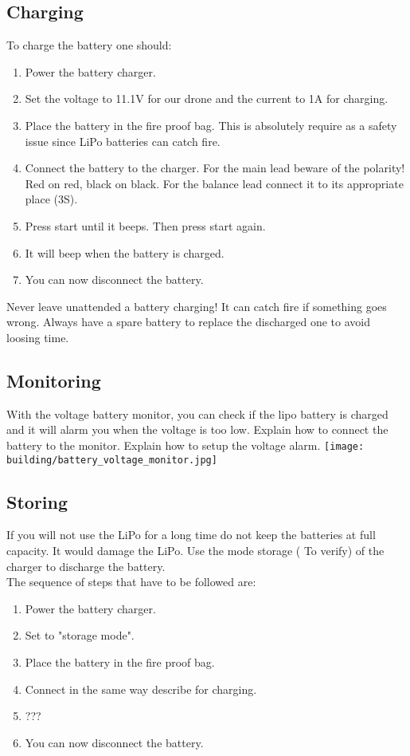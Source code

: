 \subsection{Charging}
To charge the battery one should:
\begin{enumerate}
    \item Power the battery charger.
    \item Set the voltage to 11.1V for our drone and the current to 1A for charging.
    \item Place the battery in the fire proof bag. This is absolutely require as a safety issue since LiPo batteries can catch fire.
    \item Connect the battery to the charger. For the main lead beware of the polarity! Red on red, black on black. For the balance lead connect it to its appropriate place (3S).
    \item Press start until it beeps. Then press start again.
    \item It will beep when the battery is charged.
    \item You can now disconnect the battery.
\end{enumerate}
Never leave unattended a battery charging! It can catch fire if something goes wrong.
Always have a spare battery to replace the discharged one to avoid loosing time.

\subsection{Monitoring}
With the voltage battery monitor, you can check if the lipo battery is charged and it will alarm you when the voltage is too low.
{\color{orange} Explain how to connect the battery to the monitor.}
{\color{orange} Explain how to setup the voltage alarm.}
\texttt{[image: building/battery\_voltage\_monitor.jpg]}

\subsection{Storing}
If you will not use the LiPo for a long time do not keep the batteries at full capacity. It would damage the LiPo. Use the mode storage ({\color{orange} To verify}) of the charger to discharge the battery.\\
The sequence of steps that have to be followed are:
\begin{enumerate}
    \item Power the battery charger.
    \item Set to "storage mode".
    \item Place the battery in the fire proof bag.
    \item Connect in the same way describe for charging.
    \item ???
    \item You can now disconnect the battery.
\end{enumerate}

